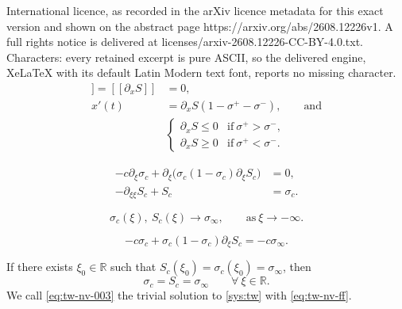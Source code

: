 \documentclass[10pt,a4paper]{amsart}
\newcommand{\dx}{\partial_x}
\begin{document}
International licence, as recorded in the arXiv licence metadata for this exact version and shown on the abstract page https://arxiv.org/abs/2608.12226v1. A full rights notice is delivered at licenses/arxiv-2608.12226-CC-BY-4.0.txt. Characters: every retained excerpt is pure ASCII, so the delivered engine, XeLaTeX with its default Latin Modern text font, reports no missing character.
    \begin{align}
        [[S]] = [[\dx S]] & = 0, \label{eq:jump-1} \\
        x'(t) & = \dx S(1- \sigma^+ - \sigma^-), \label{eq:jump-2} \qquad \text{and} \\
        \label{eq:jump-3}& \begin{cases}
            \dx S \leq 0 & \text{if} \ \sigma^+ > \sigma^-,\\
            \dx S \geq 0 & \text{if} \ \sigma^+ < \sigma^-.
        \end{cases}
    \end{align}

\begin{subequations}
    \label{sys:tw}
\begin{align}
-c\partial_\xi\sigma_c
+\partial_\xi\big(\sigma_c(1-\sigma_c)\partial_\xi S_c\big)
&=0,
\label{eq:tw-01}
\\[4pt]
-\partial_{\xi\xi}S_c+S_c
&=\sigma_c.
\label{eq:tw-02}
\end{align}
\end{subequations}

\begin{equation}
    \label{eq:tw-nv-ff}
    \sigma_c(\xi), \ S_c(\xi) \rightarrow \sigma_\infty, \qquad \text{as} \ \xi \rightarrow - \infty. 
\end{equation}

\begin{equation}
    \label{eq:tw-nv-001}
    - c \sigma_c + \sigma_c (1-\sigma_c) \partial_\xi S_c = - c \sigma_\infty.
\end{equation}

\begin{lemma}
\label{lm:no-ttrivial-point}
    If there exists $ \xi_0 \in \mathbb R $ such that $ S_c(\xi_0) = \sigma_c(\xi_0) = \sigma_\infty $, then 
    \begin{equation}
        \label{eq:tw-nv-003}
        \sigma_c = S_c = \sigma_\infty \qquad \forall \ \xi \in \mathbb R. 
    \end{equation}
    We call \eqref{eq:tw-nv-003} the trivial solution to \eqref{sys:tw} with \eqref{eq:tw-nv-ff}.
\end{lemma}
\end{document}
